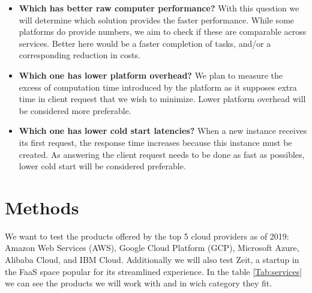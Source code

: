 \documentclass[11pt]{article}
\begin{document}
\begin{itemize}
\item \textbf{Which has better raw computer performance?} With this question we will determine which solution provides the faster performance. While some platforms do provide numbers, we aim to check if these are comparable across services. Better here would be a faster completion of tasks, and/or a corresponding reduction in costs.

\item \textbf{Which one has lower platform overhead?}  We plan to measure the excess of computation time introduced by the platform as it supposes extra time in client request that we wish to minimize. Lower platform overhead will be considered more preferable.

\item \textbf{Which one has lower cold start latencies?} When a new instance receives its first request, the response time increases because this instance must be created. As answering the client request needs to be done as fast as possibles, lower cold start will be considered preferable.
\end{itemize}






\section{Methods}
\label{methods}
We want to test the products offered by the top 5 cloud providers as of 2019: Amazon Web Services (AWS), Google Cloud Platform (GCP), Microsoft Azure, Alibaba Cloud, and IBM Cloud. Additionally we will also test Zeit, a startup in the FaaS space popular for its streamlined experience. In the table \ref{Tab:services} we can see the products we will work with and in wich category they fit. \\
\end{document}
